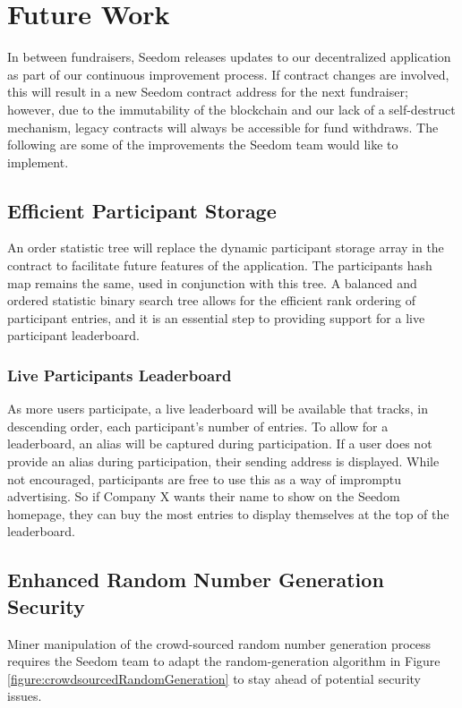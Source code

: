 \documentclass[11pt]{article}
\begin{document}
\section{Future Work}

In between fundraisers, Seedom releases updates to our decentralized application as part of our continuous improvement process. If contract changes are involved, this will result in a new Seedom contract address for the next fundraiser; however, due to the immutability of the blockchain and our lack of a self-destruct mechanism, legacy contracts will always be accessible for fund withdraws. The following are some of the improvements the Seedom team would like to implement.

\subsection{Efficient Participant Storage}

An order statistic tree \cite{5} will replace the dynamic participant storage array in the contract to facilitate future features of the application. The participants hash map remains the same, used in conjunction with this tree. A balanced and ordered statistic binary search tree allows for the efficient rank ordering of participant entries, and it is an essential step to providing support for a live participant leaderboard.

\subsubsection{Live Participants Leaderboard}

As more users participate, a live leaderboard will be available that tracks, in descending order, each participant's number of entries. To allow for a leaderboard, an alias will be captured during participation. If a user does not provide an alias during participation, their sending address is displayed. While not encouraged, participants are free to use this as a way of impromptu advertising. So if Company X wants their name to show on the Seedom homepage, they can buy the most entries to display themselves at the top of the leaderboard.

\subsection{Enhanced Random Number Generation Security}

Miner manipulation of the crowd-sourced random number generation process requires the Seedom team to adapt the random-generation algorithm in Figure \ref{figure:crowdsourcedRandomGeneration} to stay ahead of potential security issues.
\end{document}
